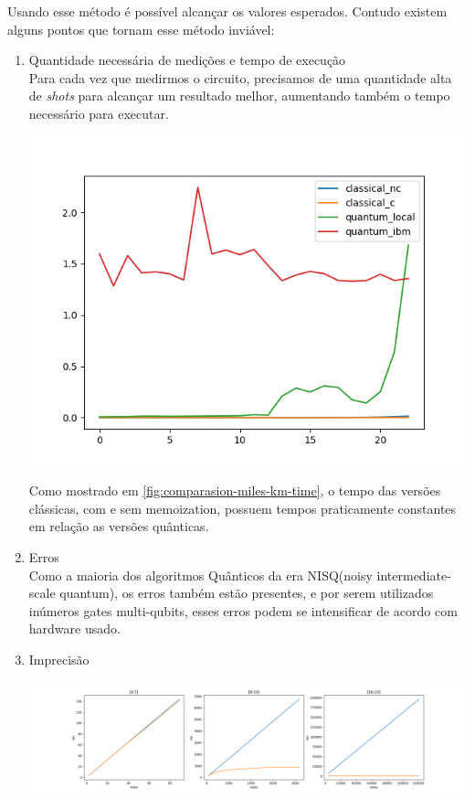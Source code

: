 \documentclass{article}
\begin{document}
Usando esse método é possível alcançar os valores esperados. Contudo existem alguns pontos que tornam esse método inviável:

\begin{enumerate}
\item{Quantidade necessária de medições e tempo de execução}\\
Para cada vez que medirmos o circuito, precisamos de uma quantidade alta de \emph{shots} para alcançar um resultado melhor, aumentando também o tempo necessário para executar.

\begin{center}
	\includegraphics[scale=0.6]{comparison_miles_to_km.png}
	\label{fig:comparasion-miles-km-time}
\end{center}

Como mostrado em \ref{fig:comparasion-miles-km-time}, o tempo das versões clássicas, com e sem memoization, possuem tempos praticamente constantes em relação as versões quânticas.


\item{Erros}\\
Como a maioria dos algoritmos Quânticos da era NISQ(noisy intermediate-scale quantum), os erros também estão presentes, e por serem utilizados inúmeros gates multi-qubits, esses erros podem se intensificar de acordo com hardware usado.

\item{Imprecisão}\\

\begin{center}
	\includegraphics[scale=0.2]{miles_to_km_defiance.png}
	\label{fig:values-miles-km-quantum}
\end{center}


\end{enumerate}
\end{document}
